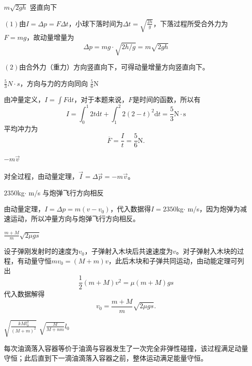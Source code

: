 \documentclass[b5paper,opensource,sourcefont,parskip]{qyxf-book}
\newcommand{\di}[1]{\mathrm{d}#1}
\begin{document}
$ m\sqrt{2gh} $ \hspace{2em} 竖直向下

\solve $(1)$由$ I=\Delta p=F\Delta t $，小球下落时间为$\Delta t=\sqrt{\frac{2h}{g}}$，下落过程所受合外力为$F=mg$，故动量增量为
\begin{equation*}
\Delta p=mg\cdot\sqrt{2h/g}=m\sqrt{2gh}
\end{equation*}

$(2)$由合外力（重力）方向竖直向下，可得动量增量方向竖直向下。

$\frac{5}{3}N\cdot s$，方向与力的方向同向 \hspace{2em} $\frac{5}{6}$N

\solve 由冲量定义，$I = \int F \di t$，对于本题来说，$F$是时间的函数，所以有
\begin{equation*}
I = \int_0^1 2t \di t + \int_1^2 2(2-t)^2 \di t = \frac{5}{3}\text{N} \cdot \text{s}
\end{equation*}
平均冲力为
\begin{equation*}
\overline{F} = \frac{I}{t} = \frac{5}{6} \text{N}.
\end{equation*}

$-m\vec{v}$

\solve 对全过程，由动量定理，$\vec{I} = \Delta \vec{p} = -m\vec{v}$。

$2350$kg$\cdot$ m/s \hspace{2em} 与炮弹飞行方向相反

\solve 由动量定理，$I = \Delta p = m(v-v_0)$，代入数据得$I=2350$kg$\cdot$ m/s，因为炮弹为减速运动，所以冲量方向与炮弹飞行方向相反。

$\frac{m+M}{m}\sqrt{2 \mu gs}$

\solve 设子弹刚发射时的速度为$v_0$，子弹射入木块后共速速度为$v$。对子弹射入木块的过程，有动量守恒$mv_0=(M+m)v$，此后木块和子弹共同运动，由动能定理可列出
\begin{equation*}
\frac{1}{2}(m+M)v^2=\mu (m+M)gs
\end{equation*}
代入数据解得
\begin{equation*}
v_0=\frac{m+M}{m}\sqrt{2 \mu gs}.
\end{equation*}

$\sqrt{\frac{kMl_0^2}{(M+m)^2}}$ \hspace{2em} $\sqrt{\frac{M}{M+nm}}l_0$

\analysis 每次油滴落入容器等价于油滴与容器发生了一次完全非弹性碰撞，该过程满足动量守恒；此后直到下一滴油滴落入容器之前，整体运动满足能量守恒。
\end{document}
